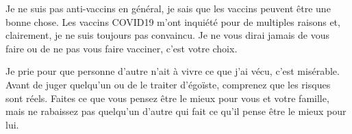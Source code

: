 {Je ne suis pas anti-vaccins en général, je sais que les vaccins peuvent être une
bonne chose. Les vaccins COVID19 m'ont inquiété pour de multiples raisons et,
clairement, je ne suis toujours pas convaincu. Je ne vous dirai jamais de vous
faire ou de ne pas vous faire vacciner, c'est votre choix.

Je prie pour que personne d'autre n'ait à vivre ce que j'ai vécu, c'est
misérable. Avant de juger quelqu'un ou de le traiter d'égoïste, comprenez que
les risques sont réels. Faites ce que vous pensez être le mieux pour vous et
votre famille, mais ne rabaissez pas quelqu'un d'autre qui fait ce qu'il pense
être le mieux pour lui.

}

